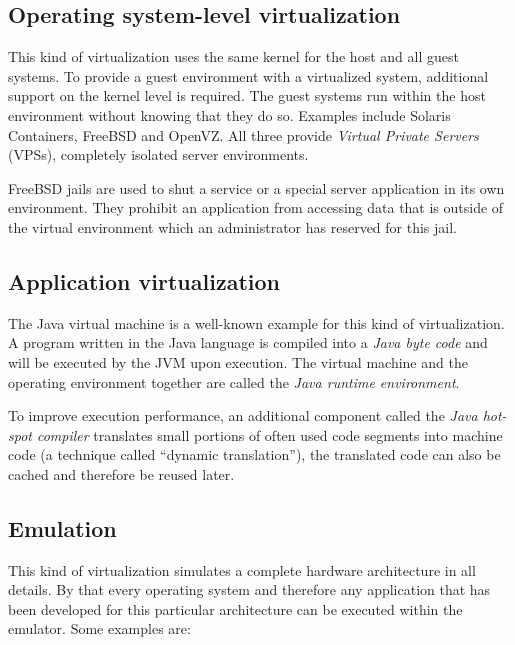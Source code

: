 \subsection{Operating system-level  virtualization}
\label{sec:oper-syst-level}

This kind  of virtualization  uses the  same kernel for  the host  and all
guest systems. To  provide a guest environment with  a virtualized system,
additional support on the kernel  level is required. The guest systems run
within the  host environment  without knowing that  they do  so.  Examples
include  Solaris  Containers,  FreeBSD  and  OpenVZ.   All  three  provide
\emph{Virtual  Private  Servers} (VPSs),  \ie  completely isolated  server
environments.

FreeBSD jails are  used to shut a service or  a special server application
in its own  environment. They prohibit an application  from accessing data
that  is outside  of the  virtual environment  which an  administrator has
reserved for this jail.

\subsection{Application virtualization}
\label{sec:appl-level-virt}

The Java virtual machine \cite{java} is a well-known example for this kind
of virtualization. A program written in the Java language is compiled into
a  \emph{Java   byte  code}  and  will   be  executed  by   the  JVM  upon
execution. The virtual machine  and the operating environment together are
called the \emph{Java runtime environment}.

To  improve  execution performance,  an  additional  component called  the
\emph{Java hot-spot compiler} translates small portions of often used code
segments into  machine code (a technique  called ``dynamic translation''),
the translated code can also be cached and therefore be reused later.

\subsection{Emulation}
\label{sec:emulation}

This kind of virtualization  simulates a complete hardware architecture in
all details. By that every  operating system and therefore any application
that has been  developed for this particular architecture  can be executed
within the emulator. Some examples are:

